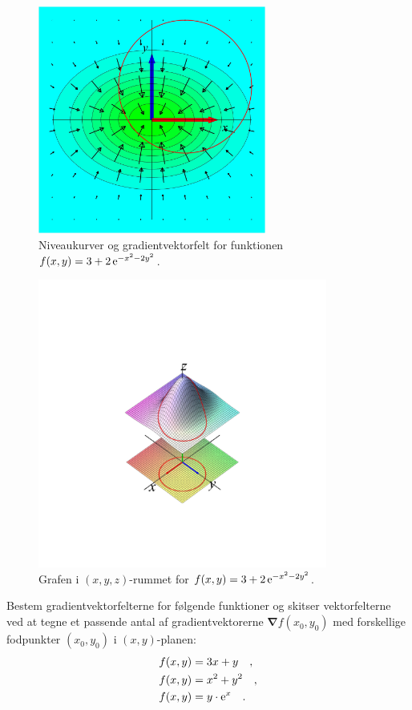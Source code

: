\begin{figure}[ht]
\centerline{ \includegraphics[height=75mm]{plotGradF.pdf}}
\begin{center}
\caption{Niveaukurver og gradientvektorfelt for funktionen $f(x,y) = 3 +  2\,\mathrm{e}^{-x^{2} - 2y^{2}}$.} \label{figMainFNivGrad}
\end{center}
\end{figure}

\begin{figure}[ht]
\centerline{ \includegraphics[height=95mm]{plotFigPureCurve01.pdf}}
\begin{center}
\caption{Grafen i $(x,y,z)$-rummet for $f(x,y) = 3 +  2\,\mathrm{e}^{-x^{2} - 2y^{2}}$.} \label{figMainF}
\end{center}
\end{figure}


\begin{exercise}
Bestem gradientvektorfelterne for følgende funktioner og skitser vektorfelterne ved at tegne et passende antal
af gradientvektorerne ${\bm{\nabla}}f(x_{0}, y_{0})$ med forskellige fodpunkter $(x_{0}, y_{0})$ i $(x,y)$-planen:
\begin{equation}
\begin{aligned}
  f(x,y) &= 3x + y \quad ,\\
  f(x,y) &= x^{2} + y^{2} \quad ,\\
  f(x,y) &= y\cdot\mathrm{e}^{x} \quad.
\end{aligned}
\end{equation}
\end{exercise}

